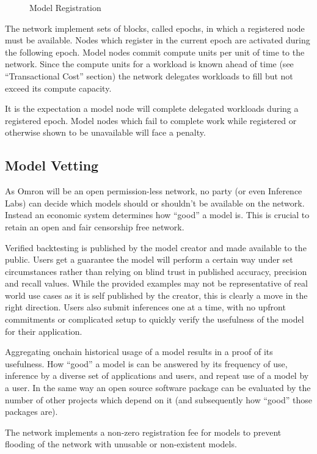 \documentclass[conference]{IEEEtran}
\begin{document}
\begin{figure}[!ht]
    \centering
    
    \caption{Model Registration}
    \label{fig:Fig 7}
\end{figure}
The network implement sets of blocks, called epochs, in which a registered node must be available. Nodes which register in the current epoch are activated during the following epoch. Model nodes commit compute units per unit of time to the network. Since the compute units for a workload is known ahead of time (see “Transactional Cost” section) the network delegates workloads to fill but not exceed its compute capacity. 

It is the expectation a model node will complete delegated workloads during a registered epoch. Model nodes which fail to complete work while registered or otherwise shown to be unavailable will face a penalty.

\subsection{Model Vetting}

As Omron will be an open permission-less network, no party (or even Inference Labs) can decide which models should or shouldn’t be available on the network. Instead an economic system determines how “good” a model is. This is crucial to retain an open and fair censorship free network.

Verified backtesting is published by the model creator and made available to the public. Users get a guarantee the model will perform a certain way under set circumstances rather than relying on blind trust in published accuracy, precision and recall values. While the provided examples may not be representative of real world use cases as it is self published by the creator, this is clearly a move in the right direction. Users also submit inferences one at a time, with no upfront commitments or complicated setup to quickly verify the usefulness of the model for their application.

Aggregating onchain historical usage of a model results in a proof of its usefulness. How “good” a model is can be answered by its frequency of use, inference by a diverse set of applications and users, and repeat use of a model by a user. In the same way an open source software package can be evaluated by the number of other projects which depend on it (and subsequently how “good” those packages are).

The network implements a non-zero registration fee for models to prevent flooding of the network with unusable or non-existent models.
\end{document}
